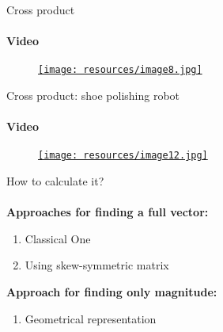 \documentclass[aspectratio=169,notes]{beamer}
\begin{document}
\begin{frame}[t]{Cross product}
    \framesubtitle{Video}
    \vspace{-0.6cm}
    \begin{figure}[H]
        \href{http://www.youtube.com/watch?v=h0NJK4mEIJU}{
            \centering\texttt{[image: resources/image8.jpg]}}
        \label{fig:resources/image8.jpg}
    \end{figure}
\end{frame}

\begin{frame}[t]{Cross product: shoe polishing robot}
    \framesubtitle{Video}
    \vspace{-0.6cm}
    \begin{figure}[H]
        \href{https://disk.yandex.ru/i/EZ1L-76imYDN9g}{
            \centering\texttt{[image: resources/image12.jpg]}}
        \label{fig:resources/image12.jpg}
    \end{figure}
\end{frame}

\begin{frame}[t]{How to calculate it?}
\framesubtitle{}
    \textbf{\LARGE Approaches for finding a full vector:}
    \begin{enumerate}
        \item Classical One
        \item Using skew-symmetric matrix
    \end{enumerate}
    \bigskip
    
    \textbf{\LARGE Approach for finding only magnitude:}
    \begin{enumerate}
        \item Geometrical representation
    \end{enumerate}
\end{frame}
\end{document}
